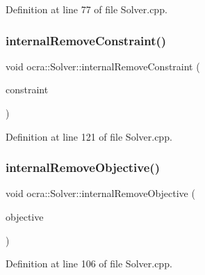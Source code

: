 Definition at line 77 of file Solver.\+cpp.

\hypertarget{classocra_1_1Solver_a9f8e8e482b24a6eb6e54e912335b1145}{}\label{classocra_1_1Solver_a9f8e8e482b24a6eb6e54e912335b1145} 
\subsubsection{\texorpdfstring{internal\+Remove\+Constraint()}{internalRemoveConstraint()}}
{\footnotesize\ttfamily void ocra\+::\+Solver\+::internal\+Remove\+Constraint (\begin{DoxyParamCaption}\item[{const \hyperlink{namespaceocra_af10341108ce661566aad00908668e2b1}{Generic\+Constraint} \&}]{constraint }\end{DoxyParamCaption})\hspace{0.3cm}{\ttfamily [protected]}}



Definition at line 121 of file Solver.\+cpp.

\hypertarget{classocra_1_1Solver_a1acd7d8b110f30f06cb157f15faa8e31}{}\label{classocra_1_1Solver_a1acd7d8b110f30f06cb157f15faa8e31} 
\subsubsection{\texorpdfstring{internal\+Remove\+Objective()}{internalRemoveObjective()}}
{\footnotesize\ttfamily void ocra\+::\+Solver\+::internal\+Remove\+Objective (\begin{DoxyParamCaption}\item[{const \hyperlink{namespaceocra_a37a91885f4fa5c523d22cb15d5673062}{Generic\+Objective} \&}]{objective }\end{DoxyParamCaption})\hspace{0.3cm}{\ttfamily [protected]}}



Definition at line 106 of file Solver.\+cpp.

\hypertarget{classocra_1_1Solver_a63e73904de66df69372ed91c6b9d058b}{}\label{classocra_1_1Solver_a63e73904de66df69372ed91c6b9d058b} 
